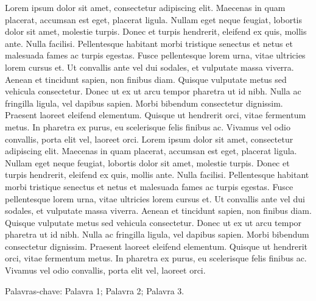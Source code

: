 \begin{resumo}
  Lorem ipsum dolor sit amet, consectetur adipiscing elit. Maecenas in quam placerat, accumsan est eget, placerat ligula. Nullam eget neque feugiat, lobortis dolor sit amet, molestie turpis. Donec et turpis hendrerit, eleifend ex quis, mollis ante. Nulla facilisi. Pellentesque habitant morbi tristique senectus et netus et malesuada fames ac turpis egestas. Fusce pellentesque lorem urna, vitae ultricies lorem cursus et. Ut convallis ante vel dui sodales, et vulputate massa viverra. Aenean et tincidunt sapien, non finibus diam. Quisque vulputate metus sed vehicula consectetur. Donec ut ex ut arcu tempor pharetra ut id nibh. Nulla ac fringilla ligula, vel dapibus sapien. Morbi bibendum consectetur dignissim. Praesent laoreet eleifend elementum. Quisque ut hendrerit orci, vitae fermentum metus. In pharetra ex purus, eu scelerisque felis finibus ac. Vivamus vel odio convallis, porta elit vel, laoreet orci. Lorem ipsum dolor sit amet, consectetur adipiscing elit. Maecenas in quam placerat, accumsan est eget, placerat ligula. Nullam eget neque feugiat, lobortis dolor sit amet, molestie turpis. Donec et turpis hendrerit, eleifend ex quis, mollis ante. Nulla facilisi. Pellentesque habitant morbi tristique senectus et netus et malesuada fames ac turpis egestas. Fusce pellentesque lorem urna, vitae ultricies lorem cursus et. Ut convallis ante vel dui sodales, et vulputate massa viverra. Aenean et tincidunt sapien, non finibus diam. Quisque vulputate metus sed vehicula consectetur. Donec ut ex ut arcu tempor pharetra ut id nibh. Nulla ac fringilla ligula, vel dapibus sapien. Morbi bibendum consectetur dignissim. Praesent laoreet eleifend elementum. Quisque ut hendrerit orci, vitae fermentum metus. In pharetra ex purus, eu scelerisque felis finibus ac. Vivamus vel odio convallis, porta elit vel, laoreet orci.

  \vspace{\baselineskip}

  Palavras-chave: Palavra 1; Palavra 2; Palavra 3.
\end{resumo}


